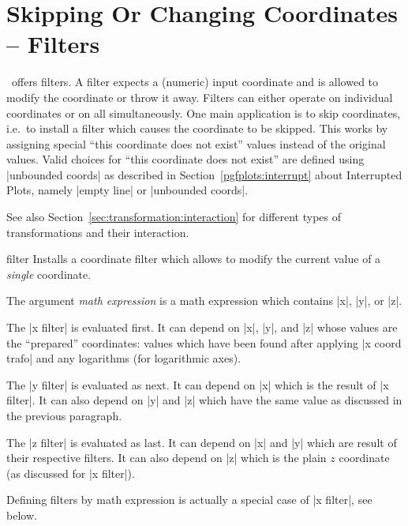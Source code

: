 
\section{Skipping Or Changing Coordinates -- Filters}
\label{sec:filters}

\PGFPlots\ offers filters. A filter expects a (numeric) input coordinate and is allowed to modify the coordinate or throw it away. Filters can either operate on individual coordinates or on all simultaneously. One main application is to skip coordinates, i.e.\ to install a filter which causes the coordinate to be skipped. This works by assigning special ``this coordinate does not exist'' values instead of the original values. Valid choices for ``this coordinate does not exist'' are defined using |unbounded coords| as described in Section~\ref{pgfplots:interrupt} about Interrupted Plots, namely |empty line| or |unbounded coords|.

See also Section~\ref{sec:transformation:interaction} for different types of transformations and their interaction.

\begin{pgfplotsxyexpressionkeylist}{\x\space filter}
	Installs a coordinate filter which allows to modify the current value of a \emph{single} coordinate.

	The argument \emph{math expression} is a math expression which contains |x|, |y|, or |z|.
\begin{codeexample}[]
\end{codeexample}
	
	The |x filter| is evaluated first. It can depend on |x|, |y|, and |z| whose values are the ``prepared'' coordinates: values which have been found after applying |x coord trafo| and any logarithms (for logarithmic axes).

	The |y filter| is evaluated as next. It can depend on |x| which is the result of |x filter|. It can also depend on |y| and |z| which have the same value as discussed in the previous paragraph.

	The |z filter| is evaluated as last. It can depend on |x| and |y| which are result of their respective filters. It can also depend on |z| which is the plain $z$ coordinate (as discussed for |x filter|).

	Defining filters by math expression is actually a special case of |x filter|, see below.
\end{pgfplotsxyexpressionkeylist}

